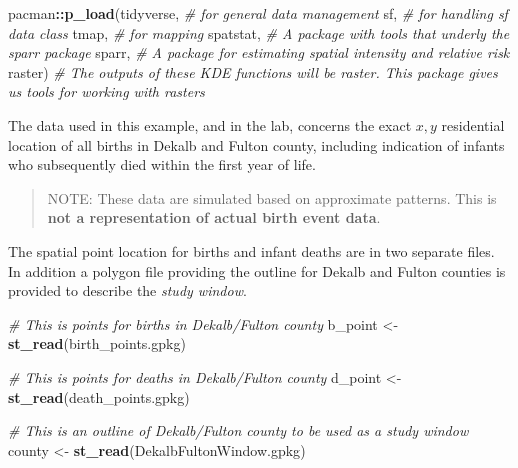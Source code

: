 \documentclass[
]{book}
\newenvironment{Shaded}{\begin{snugshade}}{\end{snugshade}}
\newcommand{\CommentTok}[1]{\textcolor[rgb]{0.56,0.35,0.01}{\textit{#1}}}
\newcommand{\FunctionTok}[1]{\textcolor[rgb]{0.13,0.29,0.53}{\textbf{#1}}}
\newcommand{\NormalTok}[1]{#1}
\newcommand{\OtherTok}[1]{\textcolor[rgb]{0.56,0.35,0.01}{#1}}
\newcommand{\SpecialCharTok}[1]{\textcolor[rgb]{0.81,0.36,0.00}{\textbf{#1}}}
\newcommand{\StringTok}[1]{\textcolor[rgb]{0.31,0.60,0.02}{#1}}
\begin{document}
\begin{Shaded}
\begin{Highlighting}[]
\NormalTok{pacman}\SpecialCharTok{::}\FunctionTok{p\_load}\NormalTok{(tidyverse,  }\CommentTok{\# for general data management}
\NormalTok{               sf,         }\CommentTok{\# for handling sf data class}
\NormalTok{               tmap,       }\CommentTok{\# for mapping}
\NormalTok{               spatstat,   }\CommentTok{\# A package with tools that underly the sparr package}
\NormalTok{               sparr,      }\CommentTok{\# A package for estimating spatial intensity and relative risk}
\NormalTok{               raster)     }\CommentTok{\# The outputs of these KDE functions will be raster. This package gives us tools for working with rasters}
\end{Highlighting}
\end{Shaded}

The data used in this example, and in the lab, concerns the exact \(x,y\) residential location of all births in Dekalb and Fulton county, including indication of infants who subsequently died within the first year of life.

\begin{quote}
NOTE: These data are simulated based on approximate patterns. This is \textbf{not a representation of actual birth event data}.
\end{quote}

The spatial point location for births and infant deaths are in two separate files. In addition a polygon file providing the outline for Dekalb and Fulton counties is provided to describe the \emph{study window}.

\begin{Shaded}
\begin{Highlighting}[]
\CommentTok{\# This is points for births in Dekalb/Fulton county}
\NormalTok{b\_point }\OtherTok{\textless{}{-}} \FunctionTok{st\_read}\NormalTok{(}\StringTok{\textquotesingle{}birth\_points.gpkg\textquotesingle{}}\NormalTok{)}

\CommentTok{\# This is points for deaths in Dekalb/Fulton county}
\NormalTok{d\_point }\OtherTok{\textless{}{-}} \FunctionTok{st\_read}\NormalTok{(}\StringTok{\textquotesingle{}death\_points.gpkg\textquotesingle{}}\NormalTok{) }

\CommentTok{\# This is an outline of Dekalb/Fulton county to be used as a study \textquotesingle{}window\textquotesingle{}}
\NormalTok{county }\OtherTok{\textless{}{-}} \FunctionTok{st\_read}\NormalTok{(}\StringTok{\textquotesingle{}DekalbFultonWindow.gpkg\textquotesingle{}}\NormalTok{) }
\end{Highlighting}
\end{Shaded}
\end{document}
